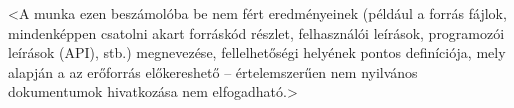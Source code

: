 \documentclass[a4paper,oneside]{article}
\begin{document}
<A munka ezen beszámolóba be nem fért eredményeinek (például a forrás
fájlok, mindenképpen csatolni akart forráskód részlet, felhasználói
leírások, programozói leírások (API), stb.) megnevezése,
fellelhetőségi helyének pontos definíciója, mely alapján a az
erőforrás előkereshető -- értelemszerűen nem nyilvános dokumentumok
hivatkozása nem elfogadható.>
\end{document}
